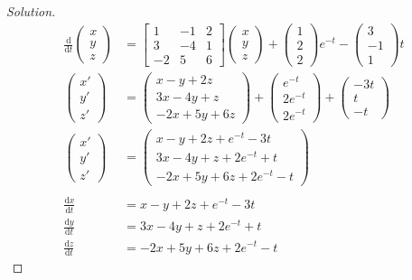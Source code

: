 \documentclass[ 12pt ]{article}
\begin{document}
\begin{enumerate}
		\begin{proof}[Solution]\renewcommand{\qedsymbol}{}
			\begin{align*}
				\frac{\mathrm{d}}{\mathrm{d}t} \begin{pmatrix} x \\ y \\ z \end{pmatrix} &= \begin{bmatrix} 1 & -1 & 2 \\ 3 & -4 & 1 \\ -2 & 5 & 6 \end{bmatrix} \begin{pmatrix} x \\ y \\ z \end{pmatrix} + \begin{pmatrix} 1 \\ 2 \\ 2 \end{pmatrix}e^{-t} - \begin{pmatrix} 3 \\ -1 \\ 1 \end{pmatrix}t \\
				\begin{pmatrix} x' \\ y' \\ z' \end{pmatrix} &= \begin{pmatrix} x - y + 2z \\ 3x - 4y + z \\ -2x + 5y + 6z \end{pmatrix} + \begin{pmatrix} e^{-t} \\ 2e^{-t} \\ 2e^{-t} \end{pmatrix} + \begin{pmatrix} -3t \\ t \\ -t \end{pmatrix} \\
				\begin{pmatrix} x' \\ y' \\ z' \end{pmatrix} &= \begin{pmatrix} x - y + 2z + e^{-t} - 3t \\ 3x - 4y + z + 2e^{-t} + t \\ -2x + 5y + 6z + 2e^{-t} - t \end{pmatrix} \\ \\
				\frac{\mathrm{d}x}{\mathrm{d}t} &= x - y + 2z + e^{-t} - 3t \\
				\frac{\mathrm{d}y}{\mathrm{d}t} &= 3x - 4y + z + 2e^{-t} + t \\
				\frac{\mathrm{d}z}{\mathrm{d}t} &= -2x + 5y + 6z + 2e^{-t} - t
			\end{align*}
		\end{proof}
		\newpage



\end{enumerate}
\end{document}
